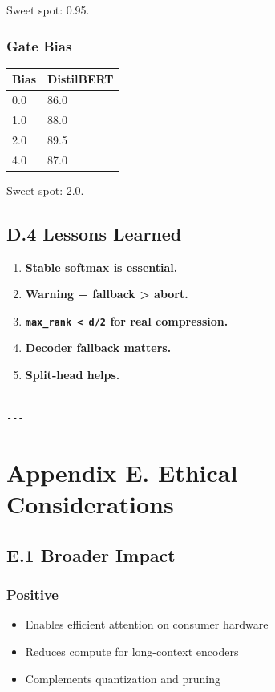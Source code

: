 Sweet spot: 0.95.

\subsubsection{Gate Bias}

\begin{table}[H]
\centering
\small
\begin{tabular}{ll}
\toprule
\textbf{Bias} & \textbf{DistilBERT} \\
\midrule
0.0 & 86.0 \\
1.0 & 88.0 \\
2.0 & 89.5 \\
4.0 & 87.0 \\
\bottomrule
\end{tabular}
\end{table}

Sweet spot: 2.0.

\subsection{D.4 Lessons Learned}

\begin{enumerate}
\item \textbf{Stable softmax is essential.}
\item \textbf{Warning + fallback \textgreater{} abort.}
\item \textbf{\texttt{max\_rank \textless{} d/2} for real compression.}
\item \textbf{Decoder fallback matters.}
\item \textbf{Split-head helps.}
\end{enumerate}
\begin{lstlisting}

---
\end{lstlisting}

\section{Appendix E. Ethical Considerations}

\subsection{E.1 Broader Impact}

\subsubsection{Positive}
\begin{itemize}
\item Enables efficient attention on consumer hardware
\item Reduces compute for long-context encoders
\item Complements quantization and pruning

\end{itemize}

